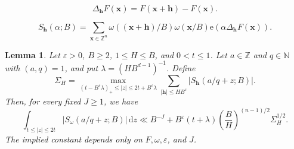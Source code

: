 \documentclass[10pt,a4paper]{amsart}
\newtheorem{lemma}{Lemma}
\newcommand{\ZZ}{\mathbb Z}
\newcommand{\dint}{\,\mathrm d}
\newcommand{\e}{\mathrm e}
\newcommand{\eps}{\varepsilon}
\newcommand{\h}{\mathbf h}
\newcommand{\x}{\mathbf{x}}
\begin{document}
\begin{equation}\label{eq:first-difference}
 \Delta_\h F(\x)=F(\x+\h)-F(\x).
\end{equation}

\begin{equation}\label{eq:first-difference-sum}
 S_{\h}(\alpha;B)=\sum_{\x\in\ZZ^n}
 \omega((\x+\h)/B)\omega(\x/B)
 \e(\alpha\Delta_\h F(\x)).
\end{equation}

\begin{lemma}\label{lem:average}
Let \(\eps>0\), \(B\geq2\), \(1\leq H\leq B\), and \(0<t\leq1\).
Let \(a\in\ZZ\) and \(q\in\mathbb N\) with \((a,q)=1\), and put \(\lambda=(HB^{d-1})^{-1}\).
Define
\begin{equation}\label{eq:shift-average}
 \Sigma_H=\max_{(t-B^\eps\lambda)_+\leq |z|
 \leq2t+B^\eps\lambda}
 \sum_{|\h|\leq HB^\eps}|S_{\h}(a/q+z;B)|.
\end{equation}
Then, for every fixed \(J\geq1\), we have
\begin{equation}\label{eq:average}
 \int_{t\leq|z|\leq2t}|S_\omega(a/q+z;B)|\dint z
 \ll B^{-J}+B^\eps(t+\lambda)
 \left(\frac BH\right)^{(n-1)/2}\Sigma_H^{1/2}.
\end{equation}
The implied constant depends only on \(F,\omega,\eps\), and \(J\).
\end{lemma}
\end{document}
